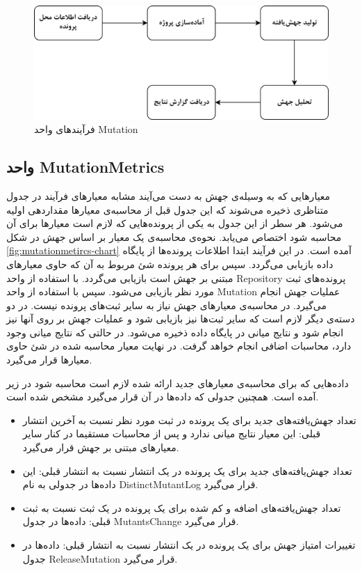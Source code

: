 \begin{figure}[H]
	\centering
	\includegraphics[width=.8\textwidth]{img/method/mutation-chart.png}
	\caption{ فرآیند‌های واحد Mutation}
	\label{fig:mutation-chart}
\end{figure}

\subsection{واحد MutationMetrics}

معیارهایی که به وسیله‌ی جهش به دست می‌آیند مشابه معیارهای فرآیند در جدول متناظری ذخیره می‌شوند که  این جدول قبل از محاسبه‌ی معیارها مقداردهی اولیه می‌شود. هر سطر از این جدول به یکی از پرونده‌هایی که لازم است معیارها برای آن محاسبه شود اختصاص می‌یابد.  نحوه‌ی محاسبه‌ی یک معیار بر اساس جهش در شکل \ref{fig:mutationmetircs-chart} آمده است. در این فرآیند ابتدا اطلاعات پرونده‌ها از پایگاه داده بازیابی می‌گردد. سپس برای هر پرونده شئ مربوط به آن که حاوی معیارهای  مبتنی  بر جهش است بازیابی می‌گردد. با استفاده از واحد Repository‌ پرونده‌های ثبت مورد نظر بازیابی می‌شود. سپس با استفاده از واحد Mutation عملیات جهش انجام می‌گیرد. در محاسبه‌ی معیارهای جهش نیاز به سایر ثبت‌های پرونده نیست. در دو دسته‌ی دیگر لازم است که سایر ثبت‌ها نیز بازیابی شود و عملیات جهش بر روی آنها نیز انجام شود و نتایج میانی در پایگاه داده ذخیره می‌شود.  در حالتی که نتایج میانی وجود دارد، محاسبات اضافی انجام خواهد گرفت.  در نهایت معیار محاسبه شده در شئ حاوی معیارها قرار می‌گیرد. 

 داده‌هایی که برای محاسبه‌ی معیارهای جدید ارائه شده لازم است محاسبه شود در زیر آمده است. همچنین جدولی که داده‌ها در آن قرار می‌گیرد مشخص شده است.
\begin{itemize}
	\item
	تعداد جهش‌یافته‌های جدید برای یک پرونده در ثبت مورد نظر نسبت به آخرین انتشار قبلی: این معیار نتایج میانی ندارد و پس از محاسبات مستقیما در کنار سایر معیارهای مبتنی بر جهش قرار می‌گیرد. 

\item 
تعداد جهش‌یافته‌های جدید برای یک پرونده در یک انتشار نسبت به 
انتشار قبلی: این داده‌ها در جدولی به نام DistinctMutantLog قرار می‌گیرد.

\item 
تعداد جهش‌یافته‌های اضافه و کم شده برای یک پرونده در یک ثبت نسبت به ثبت قبلی: داده‌ها در جدول MutantsChange قرار می‌گیرد.

\item
تغییرات امتیاز جهش برای یک پرونده در یک انتشار نسبت به انتشار قبلی: داده‌ها در جدول  ReleaseMutation قرار می‌گیرد. 

\end{itemize}

